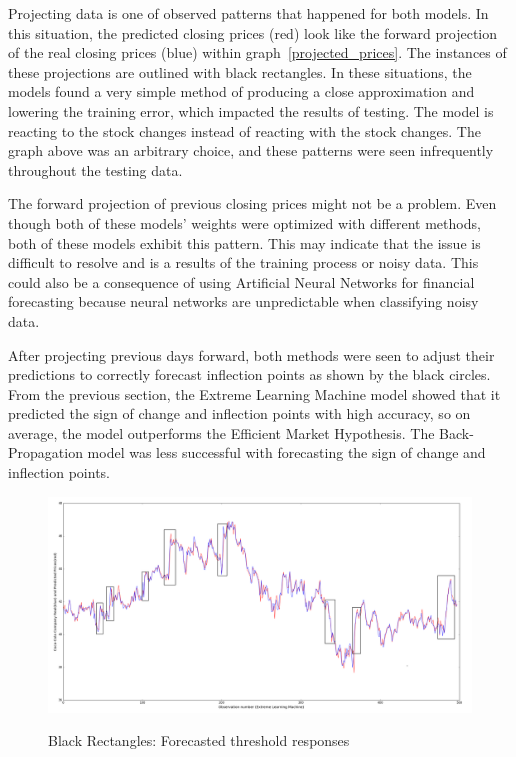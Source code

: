 \documentclass{ncjms}
\begin{document}
	Projecting data is one of observed patterns that happened for both models.
	In this situation, the predicted closing prices (red) look like the forward projection of the real closing prices (blue) within graph~\ref{projected_prices}.
	The instances of these projections are outlined with black rectangles.
	In these situations, the models found a very simple method of producing a close approximation and lowering the training error, which impacted the results of testing.
	The model is reacting to the stock changes instead of reacting with the stock changes.
	The graph above was an arbitrary choice, and these patterns were seen infrequently throughout the testing data.

	The forward projection of previous closing prices might not be a problem.
	Even though both of these models' weights were optimized with different methods, both of these models exhibit this pattern.
	This may indicate that the issue is difficult to resolve and is a results of the training process or noisy data.
	This could also be a consequence of using Artificial Neural Networks for financial forecasting because neural networks are unpredictable when classifying noisy data.

	After projecting previous days forward, both methods were seen to adjust their predictions to correctly forecast inflection points as shown by the black circles.
	From the previous section, the Extreme Learning Machine model showed that it predicted the sign of change and inflection points with high accuracy, so on average, the model outperforms the Efficient Market Hypothesis.
	The Back-Propagation model was less successful with forecasting the sign of change and inflection points.

	\begin{figure}
		\begin{center}
		\resizebox{\textwidth}{!} {
		\includegraphics{figure_threshold_response}}
		\caption{ Black Rectangles: Forecasted threshold responses }
		\label{threshold_responses}
		\end{center}
	\end{figure}
\end{document}
